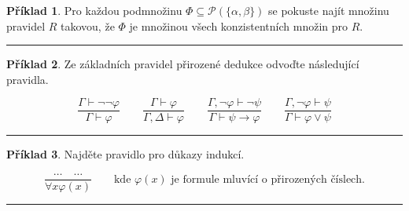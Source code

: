 \documentclass[a4paper]{article}
\theoremstyle{definition}
\newtheorem{priklad}{Příklad}
\begin{document}
\begin{priklad}
    Pro každou podmnožinu $ \Phi\subseteq \mathcal{P}(\{\alpha,\beta\}) $ se pokuste najít množinu pravidel $ R $ takovou, že $ \Phi $ je množinou všech konzistentních množin pro $ R $.
    
\noindent\rule{\linewidth}{.2pt}    
\end{priklad}

\begin{priklad}
    Ze základních pravidel přirozené dedukce odvoďte následující pravidla.
    
    \[
    \frac{\Gamma\vdash \neg\neg\varphi}{\Gamma\vdash\varphi} \qquad 
    \frac{\Gamma\vdash \varphi}{\Gamma,\Delta\vdash\varphi} \qquad
    \frac{\Gamma,\neg\varphi\vdash \neg\psi}{\Gamma\vdash\psi\rightarrow\varphi} \qquad
    \frac{\Gamma,\neg\varphi\vdash \psi}{\Gamma\vdash\varphi\vee\psi}
    \]
    
\noindent\rule{\linewidth}{.2pt}    
\end{priklad}

\begin{priklad}
    Najděte pravidlo pro důkazy indukcí.
    
    \[ \frac{\ldots\quad\ldots}{\forall x\varphi(x)} \qquad \text{kde } \varphi(x) \text{ je formule mluvící o přirozených číslech.} \]
    
\noindent\rule{\linewidth}{.2pt}    
\end{priklad}

\newpage
\end{document}
